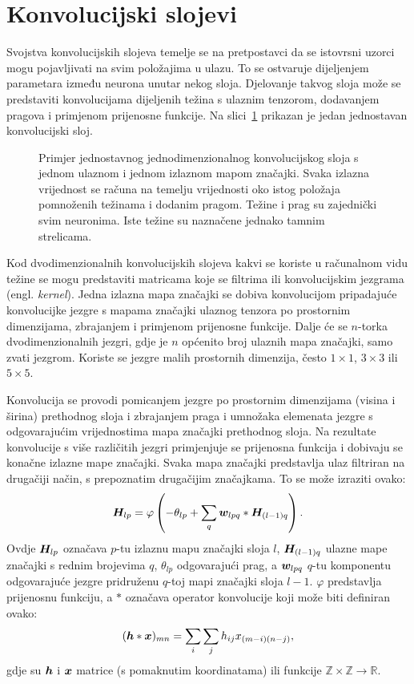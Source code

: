 \documentclass[utf8, seminar, numeric, lmodern]{feri}
\newcommand{\ilustracija}[1]{}
\begin{document}
\section{Konvolucijski slojevi} \label{sec:konv-sloj}

Svojstva konvolucijskih slojeva temelje se na pretpostavci da se istovrsni uzorci mogu pojavljivati na svim položajima u ulazu. To se ostvaruje dijeljenjem parametara između neurona unutar nekog sloja. Djelovanje takvog sloja može se predstaviti konvolucijama dijeljenih težina s ulaznim tenzorom, dodavanjem pragova i primjenom prijenosne funkcije. Na slici~\ref{fig:lok_pov} prikazan je jedan jednostavan konvolucijski sloj.

\begin{figure}[htbp] \centering
	\ilustracija{konv-sloj}
	\caption{Primjer jednostavnog jednodimenzionalnog konvolucijskog sloja s jednom ulaznom i jednom izlaznom mapom značajki. Svaka izlazna vrijednost se računa na temelju vrijednosti oko istog položaja pomnoženih težinama i dodanim pragom. Težine i prag su zajednički svim neuronima. Iste težine su naznačene jednako tamnim strelicama.}
	\label{fig:lok_pov}
\end{figure}

Kod dvodimenzionalnih konvolucijskih slojeva kakvi se koriste u računalnom vidu težine se mogu predstaviti matricama koje se filtrima ili konvolucijskim jezgrama (engl. \emph{kernel}). Jedna izlazna mapa značajki se dobiva konvolucijom pripadajuće konvolucijke jezgre s mapama značajki ulaznog tenzora po prostornim dimenzijama, zbrajanjem i primjenom prijenosne funkcije. Dalje će se $n$-torka dvodimenzionalnih jezgri, gdje je $n$ općenito broj ulaznih mapa značajki, samo zvati jezgrom. Koriste se jezgre malih prostornih dimenzija, često $1\times 1$, $3\times3$ ili $5\times5$.

Konvolucija se provodi pomicanjem jezgre po prostornim dimenzijama (visina i širina) prethodnog sloja i zbrajanjem praga i umnožaka elemenata jezgre s odgovarajućim vrijednostima mapa značajki prethodnog sloja. Na rezultate konvolucije s više različitih jezgri primjenjuje se prijenosna funkcija i dobivaju se konačne izlazne mape značajki. Svaka mapa značajki predstavlja ulaz filtriran na drugačiji način, s prepoznatim drugačijim značajkama. To se može izraziti ovako:
\begin{equation}
\bm{H}_{lp}=\varphi\left(
-\theta_{lp} + \sum_q \bm{w}_{lpq}\ast\bm{H}_{(l-1)q}\right).
\end{equation}
Ovdje $\bm{H}_{lp}$ označava $p$-tu izlaznu mapu značajki sloja $l$, $\bm{H}_{(l-1)q}$ ulazne mape značajki s rednim brojevima $q$, $\theta_{lp}$ odgovarajući prag, a $\bm{w}_{lpq}$ $q$-tu komponentu odgovarajuće jezgre pridruženu $q$-toj mapi značajki sloja $l-1$. $\varphi$ predstavlja prijenosnu funkciju, a $\ast$ označava operator konvolucije koji može biti definiran ovako:
\begin{equation}
(\bm{h}\ast\bm{x})_{mn} = \sum_i \sum_j h_{ij} x_{(m-i)(n-j)},
\end{equation}
gdje su $\bm{h}$ i $\bm{x}$ matrice (s pomaknutim koordinatama) ili funkcije $\mathbb{Z}\times\mathbb{Z}\rightarrow\mathbb{R}$.
\end{document}
